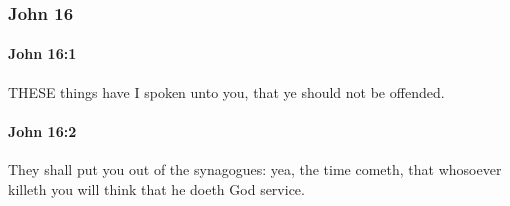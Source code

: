 	\subsubsection{John 16} %
		\label{JOHN-16}
		
		\paragraph{John 16:1} %
			\label{JOHN-16-1}

			THESE things have I spoken unto you, that ye should not be offended.

			\begin{framed}
				\scriptsize
				\begin{compactdesc}
					\item[SBLG] 
				\end{compactdesc}
			\end{framed}

		\paragraph{John 16:2} %
			\label{JOHN-16-2}

			They shall put you out of the synagogues: yea, the time cometh, that whosoever killeth you will think that he doeth God service.

